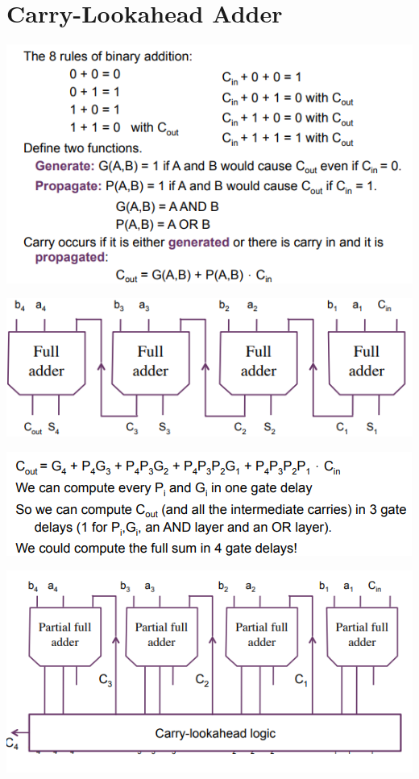 \documentclass{article}[18pt]
\begin{document}
\section{Carry-Lookahead Adder}
\begin{center}
	\includegraphics[scale=0.7]{carry-lookahead}
\end{center}
\begin{center}
	\includegraphics[scale=0.7]{carry-lookahead1}
\end{center}
\begin{center}
	\includegraphics[scale=0.7]{carry-lookahead2}
\end{center}
\begin{center}
	\includegraphics[scale=0.7]{carry-lookahead3}
\end{center}
\end{document}
